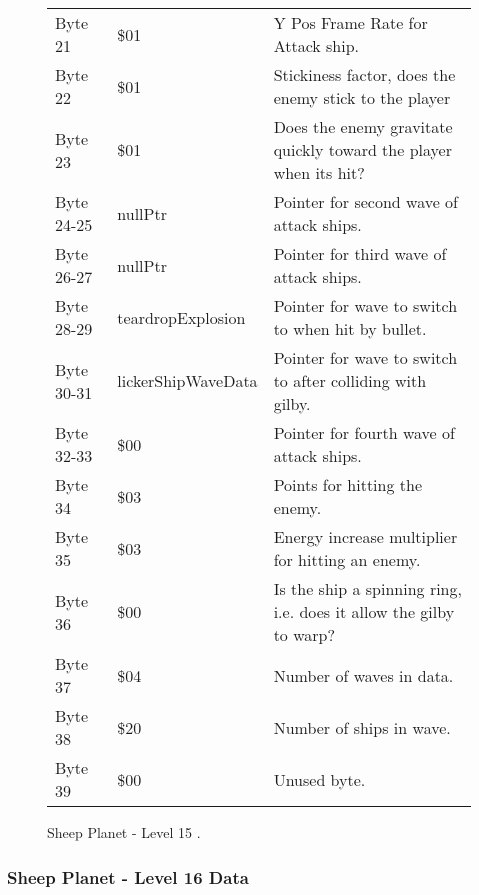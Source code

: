 \begin{figure}[H]
{\begin{adjustbox}{width=12cm}
\begin{tabular}{lll}
 Byte 21    & \$01                & Y Pos Frame Rate for Attack ship.                                   \\
 Byte 22    & \$01                & Stickiness factor, does the enemy stick to the player               \\
 Byte 23    & \$01                & Does the enemy gravitate quickly toward the player when its hit?    \\
 Byte 24-25 & nullPtr            & Pointer for second wave of attack ships.                            \\
 Byte 26-27 & nullPtr            & Pointer for third wave of attack ships.                             \\
 Byte 28-29 & teardropExplosion  & Pointer for wave to switch to when hit by bullet.                   \\
 Byte 30-31 & lickerShipWaveData & Pointer for  wave to switch to after colliding with gilby.          \\
 Byte 32-33 & \$00                & Pointer for fourth wave of attack ships.                            \\
 Byte 34    & \$03                & Points for hitting the enemy.                                       \\
 Byte 35    & \$03                & Energy increase multiplier for hitting an enemy.                    \\
 Byte 36    & \$00                & Is the ship a spinning ring, i.e. does it allow the gilby to warp?  \\
 Byte 37    & \$04                & Number of waves in data.                                            \\
 Byte 38    & \$20                & Number of ships in wave.                                            \\
 Byte 39    & \$00                & Unused byte.                                                        \\
\bottomrule
\end{tabular}

  \end{adjustbox}

  }\caption*{Sheep Planet - Level 15
.}
\end{figure}

\clearpage
\subsubsection{Sheep Planet - Level 16 Data}

